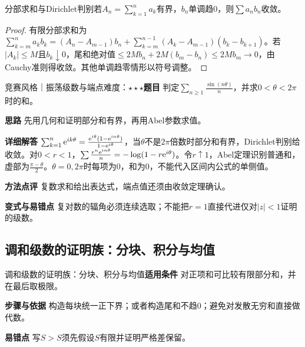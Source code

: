 \begin{theorem}{分部求和与Dirichlet判别}若$A_n=\sum_{k=1}^na_k$有界，$b_n$单调趋0，则$\sum a_nb_n$收敛。\end{theorem}\begin{proof}有限分部求和为$\sum_{k=m}^na_kb_k=(A_n-A_{m-1})b_n+\sum_{k=m}^{n-1}(A_k-A_{m-1})(b_k-b_{k+1})$。若$|A_k|\le M$且$b_k\downarrow0$，尾和绝对值$\le2M b_n+2M(b_m-b_n)\le2Mb_m\to0$，由Cauchy准则得收敛。其他单调趋零情形以符号调整。\end{proof}

\begin{example}{竞赛风格｜振荡级数与端点}{难度：$\star\star\star$}\label{deep:ex:series_source_deep:oscillation}\textbf{题目} 判定$\sum_{n\ge1}\frac{\sin(n\theta)}{n}$，并求$0<\theta<2\pi$时的和。\par\textbf{思路} 先用几何和证明部分和有界，再用Abel参数求值。\par\textbf{详细解答} $\sum_{k=1}^n\mathrm{e}^{ik\theta}=\frac{\mathrm{e}^{i\theta}(1-\mathrm{e}^{in\theta})}{1-\mathrm{e}^{i\theta}}$，当$\theta$不是$2\pi$倍数时部分和有界，Dirichlet判别给收敛。对$0<r<1$，$\sum \frac{r^n\mathrm{e}^{in\theta}}{n}=-\log(1-r\mathrm{e}^{i\theta})$。令$r\uparrow1$，Abel定理识别普通和，虚部为$\frac{\pi-\theta}{2}$。$\theta=0,2\pi$时每项为0，和为0，不能代入区间内公式的单侧值。\par\textbf{方法点评} 复数求和给出表达式，端点值还须由收敛定理确认。\par\textbf{变式与易错点} 复对数的辐角必须连续选取；不能把$r=1$直接代进仅对$|z|<1$证明的级数。\end{example}

\subsection{调和级数的证明族：分块、积分与均值}\label{deep:series_source_deep:harmonic}

\begin{method}{调和级数的证明族：分块、积分与均值}\textbf{适用条件} 对正项和可比较有限部分和，并在最后取极限。\par\textbf{步骤与依据} 构造每块统一正下界；或者构造尾和不趋0；避免对发散无穷和直接做代数。\par\textbf{易错点} 写$S>S$须先假设$S$有限并证明严格差保留。\end{method}

